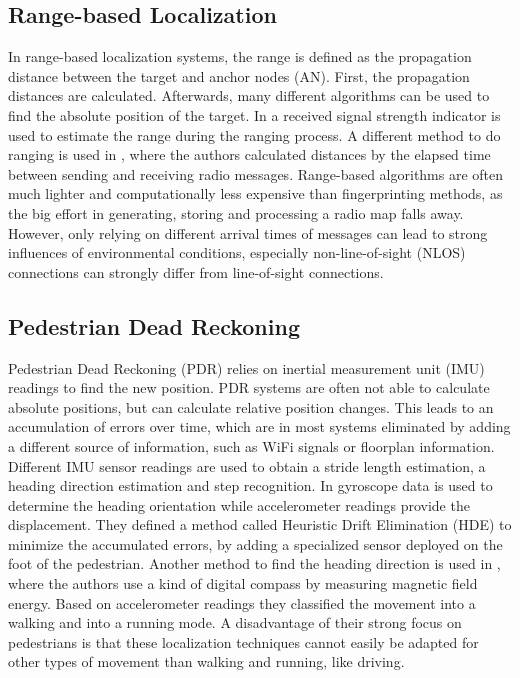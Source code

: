 \subsection{Range-based Localization}
In range-based localization systems, the range is defined as the propagation distance between the target and anchor nodes (AN). First, the propagation distances are calculated. Afterwards, many different algorithms can be used to find the absolute position of the target. In \cite{Horus} a received signal strength indicator is used to estimate the range during the ranging process. A different method to do ranging is used in \cite{IEEE}, where the authors calculated distances by the elapsed time between sending and receiving radio messages. Range-based algorithms are often much lighter and computationally less expensive than fingerprinting methods, as the big effort in generating, storing and processing a radio map falls away. However, only relying on different arrival times of messages can lead to strong influences of environmental conditions, especially non-line-of-sight (NLOS) connections can strongly differ from line-of-sight connections.

\subsection{Pedestrian Dead Reckoning}
Pedestrian Dead Reckoning (PDR) relies on inertial measurement unit (IMU) readings to find the new position. PDR systems are often not able to calculate absolute positions, but can calculate relative position changes. This leads to an accumulation of errors over time, which are in most systems eliminated by adding a different source of information, such as WiFi signals or floorplan information. Different IMU sensor readings are used to obtain a stride length estimation, a heading direction estimation and step recognition. In \cite{Borestein} gyroscope data is used to determine the heading orientation while accelerometer readings provide the displacement. They defined a method called Heuristic Drift Elimination (HDE) to minimize the accumulated errors, by adding a specialized sensor deployed on the foot of the pedestrian. Another method to find the heading direction is used in \cite{Kakiuchi}, where the authors use a kind of digital compass by measuring magnetic field energy. Based on accelerometer readings they classified the movement into a walking and into a running mode. A disadvantage of their strong focus on pedestrians is that these localization techniques cannot easily be adapted for other types of movement than walking and running, like driving.  

